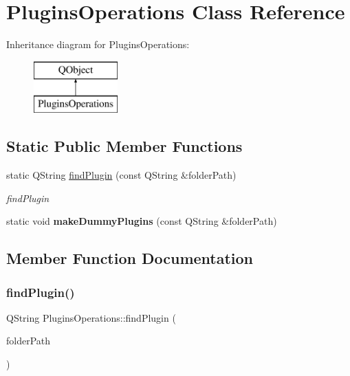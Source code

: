 \hypertarget{class_plugins_operations}{}\section{Plugins\+Operations Class Reference}
\label{class_plugins_operations}
Inheritance diagram for Plugins\+Operations\+:\begin{figure}[H]
\begin{center}
\leavevmode
\includegraphics[height=2.000000cm]{class_plugins_operations}
\end{center}
\end{figure}
\subsection*{Static Public Member Functions}
\begin{DoxyCompactItemize}
\item 
static Q\+String \mbox{\hyperlink{class_plugins_operations_a54687efb89e2c74726089be6d8943f88}{find\+Plugin}} (const Q\+String \&folder\+Path)
\begin{DoxyCompactList}\small\item\em find\+Plugin \end{DoxyCompactList}\item 
\mbox{\label{class_plugins_operations_ac361ea0abc1b79042e40f3bd9e3be6f3}} 
static void {\bfseries make\+Dummy\+Plugins} (const Q\+String \&folder\+Path)
\end{DoxyCompactItemize}


\subsection{Member Function Documentation}
\mbox{\label{class_plugins_operations_a54687efb89e2c74726089be6d8943f88}} 
\subsubsection{\texorpdfstring{findPlugin()}{findPlugin()}}
{\footnotesize\ttfamily Q\+String Plugins\+Operations\+::find\+Plugin (\begin{DoxyParamCaption}\item[{const Q\+String \&}]{folder\+Path }\end{DoxyParamCaption})\hspace{0.3cm}{\ttfamily [static]}}



